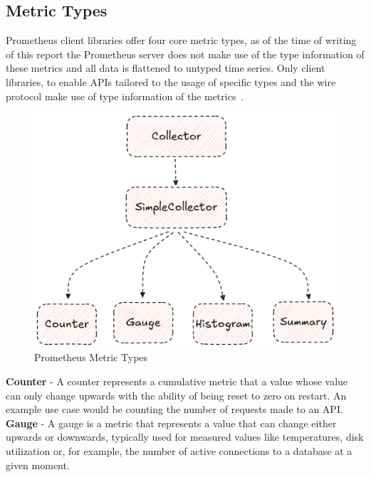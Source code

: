 \subsection{Metric Types}\label{subsec:metric-types}

Prometheus client libraries offer four core metric types, as of the time of writing of this report the Prometheus
server does not make use of the type information of these metrics and all data is flattened to untyped time series.
Only client libraries, to enable \ac{API}s tailored to the usage of specific types and the wire protocol make use of
type information of the metrics~\cite{prometheus_metric_types}.\\

\begin{figure}[H]
    \centering
    \includegraphics[width=\linewidth, keepaspectratio]{./figures/metric_types}
    \caption{Prometheus Metric Types}
\end{figure}


\textbf{Counter} - A counter represents a cumulative metric that a value whose value can only change upwards with
the ability of being reset to zero on restart.
An example use case would be counting the number of requests made to an \ac{API}.\\

\textbf{Gauge} - A gauge is a metric that represents a value that can change either upwards or downwards, typically
used for measured values like temperatures, disk utilization or, for example, the number of active connections
to a database at a given moment.


